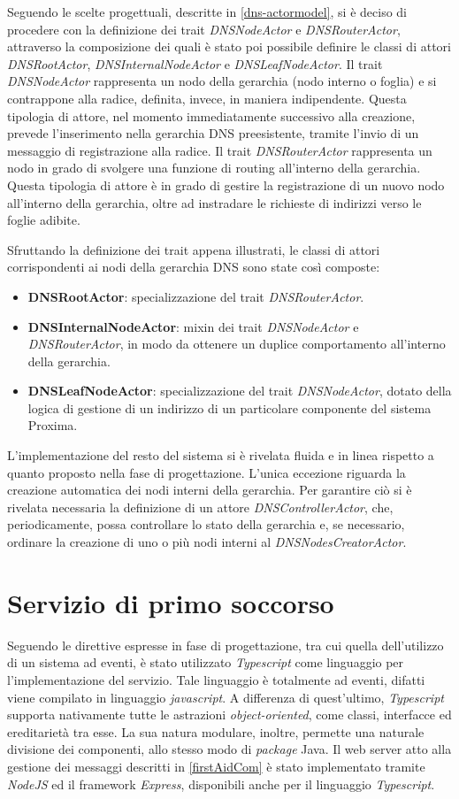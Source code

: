 \documentclass[a4paper,12pt]{report}
\begin{document}
Seguendo le scelte progettuali, descritte in \autoref{dns-actormodel}, si è deciso di procedere con la definizione dei trait \emph{DNSNodeActor} e \emph{DNSRouterActor}, attraverso la composizione dei quali è stato poi possibile definire le classi di attori \emph{DNSRootActor}, \emph{DNSInternalNodeActor} e \emph{DNSLeafNodeActor}. Il trait \emph{DNSNodeActor} rappresenta un nodo della gerarchia (nodo interno o foglia) e si contrappone alla radice, definita, invece, in maniera indipendente. Questa tipologia di attore, nel momento immediatamente successivo alla creazione, prevede l'inserimento nella gerarchia DNS preesistente, tramite l'invio di un messaggio di registrazione alla radice. Il trait \emph{DNSRouterActor} rappresenta un nodo in grado di svolgere una funzione di routing all'interno della gerarchia. Questa tipologia di attore è in grado di gestire la registrazione di un nuovo nodo all'interno della gerarchia, oltre ad instradare le richieste di indirizzi verso le foglie adibite.

Sfruttando la definizione dei trait appena illustrati, le classi di attori corrispondenti ai nodi della gerarchia DNS sono state così composte:
\begin{itemize}
	\item \textbf{DNSRootActor}: specializzazione del trait \emph{DNSRouterActor}.
	\item \textbf{DNSInternalNodeActor}: mixin dei trait \emph{DNSNodeActor} e \emph{DNSRouterActor}, in modo da ottenere un duplice comportamento all'interno della gerarchia.
	\item \textbf{DNSLeafNodeActor}: specializzazione del trait \emph{DNSNodeActor}, dotato della logica di gestione di un indirizzo di un particolare componente del sistema Proxima.
\end{itemize}

L'implementazione del resto del sistema si è rivelata fluida e in linea rispetto a quanto proposto nella fase di progettazione. L'unica eccezione riguarda la creazione automatica dei nodi interni della gerarchia. Per garantire ciò si è rivelata necessaria la definizione di un attore \emph{DNSControllerActor}, che, periodicamente, possa controllare lo stato della gerarchia e, se necessario, ordinare la creazione di uno o più nodi interni al \emph{DNSNodesCreatorActor}.
\section{Servizio di primo soccorso}
Seguendo le direttive espresse in fase di progettazione, tra cui quella dell'utilizzo di un sistema ad eventi, è stato utilizzato \emph{Typescript} come linguaggio per l'implementazione del servizio. Tale linguaggio è totalmente ad eventi, difatti viene compilato in linguaggio \emph{javascript}. A differenza di quest'ultimo, \emph{Typescript} supporta nativamente tutte le astrazioni \emph{object-oriented}, come classi, interfacce ed ereditarietà tra esse. La sua natura modulare, inoltre, permette una naturale divisione dei componenti, allo stesso modo di \emph{package} Java. Il web server atto alla gestione dei messaggi descritti in \autoref{firstAidCom} è stato implementato tramite \emph{NodeJS} ed il framework \emph{Express}, disponibili anche per il linguaggio \emph{Typescript}.
\end{document}
